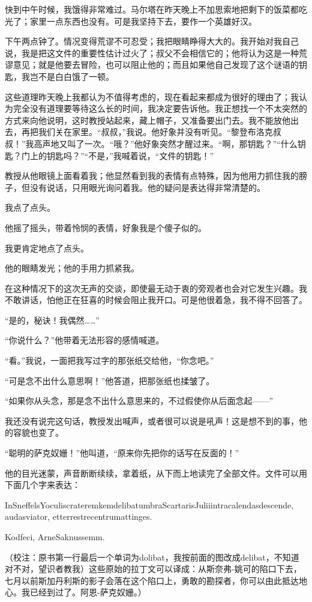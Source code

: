 \documentclass[10pt]{book}
\begin{document}
快到中午时候，我饿得非常难过。马尔塔在昨天晚上不加思索地把剩下的饭菜都吃光了；家里一点东西也没有。可是我坚持下去，要作一个英雄好汉。

下午两点钟了。情况变得荒谬不可忍受；我把眼睛睁得大大的。我开始对我自己说，我是把这文件的重要性估计过火了；叔父不会相信它的；他将认为这是一种荒谬意见；就是他要去冒险，也可以阻止他的；而且如果他自己发现了这个谜语的钥匙，我岂不是白白饿了一顿。

这些道理昨天晚上我都认为不值得考虑的，现在看起来都成为很好的理由了；我认为完全没有道理要等待这么长的时间，我决定要告诉他。我正想找一个不太突然的方式来向他说明，这时教授站起来，藏上帽子，又准备要出门去。我不能放他出去，再把我们关在家里。“叔叔，”我说。他好象并没有听见。“黎登布洛克叔叔！”我高声地又叫了一次。“哦？”他好象突然才醒过来。“啊，那钥匙？”“什么钥匙？门上的钥匙吗？”“不是，”我喊着说，“文件的钥匙！”

教授从他眼镜上面看着我；他显然看到我的表情有点特殊，因为他用力抓住我的膀子，但没有说话，只用眼光询问着我。他的疑问是表达得非常清楚的。

我点了点头。

他摇了摇头，带着怜悯的表情，好象我是个傻子似的。

我更肯定地点了点头。

他的眼睛发光；他的手用力抓紧我。

在这种情况下的这次无声的交谈，即使最无动于衷的旁观者也会对它发生兴趣。我不敢讲话，怕他正在狂喜的时候会阻止我开口。可是他很着急，我不得不回答了。

“是的，秘诀！我偶然……”

“你说什么？”他带着无法形容的感情喊道。

“看。”我说，一面把我写过字的那张纸交给他，“你念吧。”

“可是念不出什么意思啊！”他答道，把那张纸也揉皱了。

“如果你从头念，那是念不出什么意思来的，不过假使你从后面念起——”

我还没有说完这句话，教授发出喊声，或者很可以说是吼声！这是想不到的事，他的容貌也变了。

“聪明的萨克奴姗！”他叫道，“原来你先把你的话写在反面的！”

他的目光迷蒙，声音断断续续，拿着纸，从下而上地读完了全部文件。文件可以用下面几个字来表达：

InSneffelsYoculiscrateremkemdelibatumbraScartarisJuliiintracalendasdescende, audasviator, etterrestrecentrumattinges.

Kodfeci, ArneSaknussemm.

（校注：原书第一行最后一个单词为dolibat，我按前面的图改成delibat，不知道对不对，望识者教我）这些原始的拉丁文可以译成：从斯奈弗-姚可的陷口下去，七月以前斯加丹利斯的影子会落在这个陷口上，勇敢的勘探者，你可以由此抵达地心。我已经到过了。阿恩-萨克奴姗。）
\end{document}
